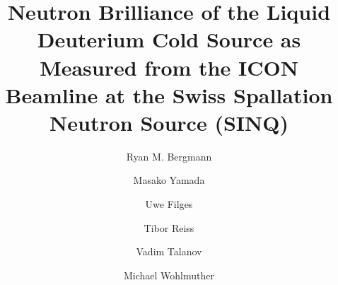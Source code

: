 \documentclass[5p,12pt]{elsarticle}
\begin{document}
\begin{frontmatter}



\title{Neutron Brilliance of the Liquid Deuterium Cold Source as Measured from the ICON Beamline at the Swiss Spallation Neutron Source (SINQ)}


\author[gfa]{Ryan M. Bergmann}

\author[num]{Masako Yamada}

\author[num]{Uwe Filges}

\author[gfa]{Tibor Reiss}

\author[gfa]{Vadim Talanov}

\author[gfa]{Michael Wohlmuther}

\address[gfa]{Division Large Research Facilities (GFA), Paul Scherrer Institut, Villigen, Switzerland}
\address[num]{Division Research with Neutrons and Muons (NUM), Paul Scherrer Institut, Villigen, Switzerland}


\begin{abstract}


\end{abstract}
\end{frontmatter}
\end{document}

